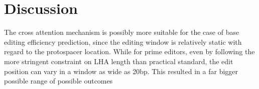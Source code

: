 \chapter{Discussion}

The cross attention mechanism is possibly more suitable for the case of base editing efficiency prediction, since the editing window is relatively static with regard to the protospacer location. While for prime editors, even by following the more stringent constraint on LHA length than practical standard, the edit position can vary in a window as wide as 20bp. This resulted in a far bigger possible range of possible outcomes